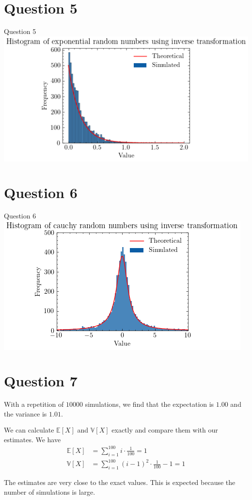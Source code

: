 \documentclass[compress,12pt]{beamer}
\begin{document}
\section{Question 5}
\begin{frame}{Question 5}
\centering
\includegraphics[scale=0.7]{imgs/exprv.png}
\end{frame}

\section{Question 6}
\begin{frame}{Question 6}
\centering
\includegraphics[scale=0.7]{imgs/cauchyrv.png}
\end{frame}

\section{Question 7}
\begin{frame}

With a repetition of $10000$ simulations, we find that {\color{red}the expectation is $1.00$} and {\color{red}the variance is $1.01$}.


We can calculate $\mathbb{E}[X]$ and $\mathbb{V}[X]$ exactly and compare them with our estimates. We have
\begin{align*}
    \mathbb{E}[X] &= \sum_{i=1}^{100} i \cdot \frac{1}{100} = 1 \\
    \mathbb{V}[X] &= \sum_{i=1}^{100} (i - 1)^2 \cdot \frac{1}{100} - 1 = 1
\end{align*}

{\color{red}The estimates are very close to the exact values.} This is expected because the number of simulations is large.
\end{frame}
\end{document}
